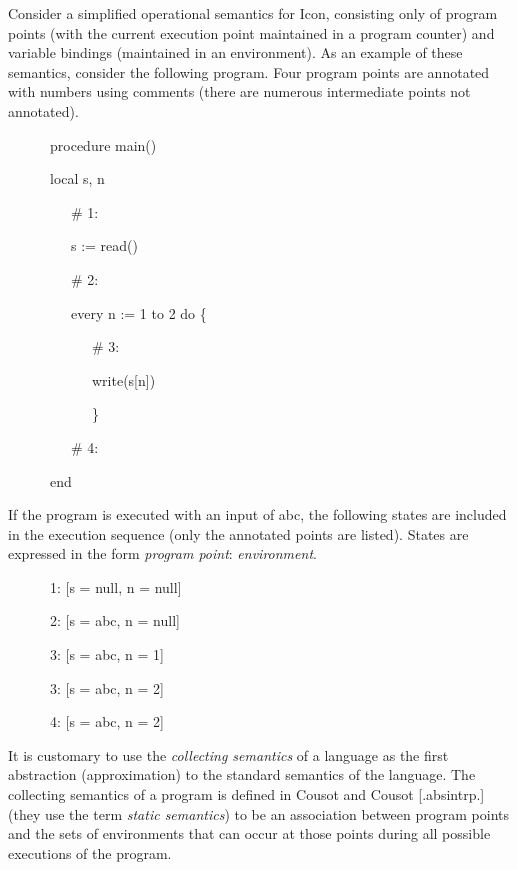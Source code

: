 Consider a simplified operational semantics for Icon, consisting only
of program points (with the current execution point maintained in a
program counter) and variable bindings (maintained in an
environment). As an example of these semantics, consider the following
program. Four program points are annotated with numbers using comments
(there are numerous intermediate points not annotated).

{\ttfamily\mdseries
\ \ \ \ \ \ procedure main()}

{\ttfamily\mdseries
\ \ \ \ \ \ local s, n}


\bigskip

{\ttfamily\mdseries
\ \ \ \ \ \ \ \ \ \# 1:}

{\ttfamily\mdseries
\ \ \ \ \ \ \ \ \ s := read()}

{\ttfamily\mdseries
\ \ \ \ \ \ \ \ \ \# 2:}

{\ttfamily\mdseries
\ \ \ \ \ \ \ \ \ every n := 1 to 2 do \{}

{\ttfamily\mdseries
\ \ \ \ \ \ \ \ \ \ \ \ \# 3:}

{\ttfamily\mdseries
\ \ \ \ \ \ \ \ \ \ \ \ write(s[n])}

{\ttfamily\mdseries
\ \ \ \ \ \ \ \ \ \ \ \ \}}

{\ttfamily\mdseries
\ \ \ \ \ \ \ \ \ \# 4:}

{\ttfamily\mdseries
\ \ \ \ \ \ end}


If the program is executed with an input of abc, the following states
are included in the execution sequence (only the annotated points are
listed). States are expressed in the form \textit{program point}:
\textit{environment}.

{\ttfamily\mdseries
\ \ \ \ \ \ 1: [s = null, n = null]}

{\ttfamily\mdseries
\ \ \ \ \ \ 2: [s = {\textquotedbl}abc{\textquotedbl}, n = null]}

{\ttfamily\mdseries
\ \ \ \ \ \ 3: [s = {\textquotedbl}abc{\textquotedbl}, n = 1]}

{\ttfamily\mdseries
\ \ \ \ \ \ 3: [s = {\textquotedbl}abc{\textquotedbl}, n = 2]}

{\ttfamily\mdseries
\ \ \ \ \ \ 4: [s = {\textquotedbl}abc{\textquotedbl}, n = 2]}


It is customary to use the \textit{collecting semantics} of a language
as the first abstraction (approximation) to the standard semantics of
the language. The collecting semantics of a program is defined in
Cousot and Cousot [.absintrp.]  (they use the term \textit{static
semantics}) to be an association between program points and the sets
of environments that can occur at those points during all possible
executions of the program.


